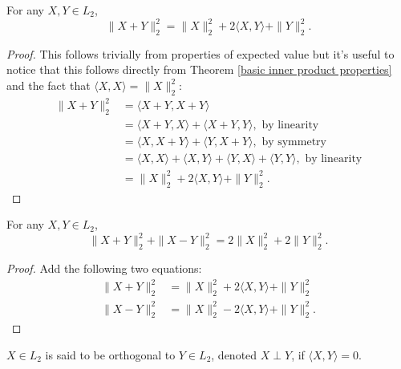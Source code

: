 \begin{theorem}[{\bf Pythagorean}]
For any $X, Y\in L_2$,
\[ \|X+Y \|_2^2 = \|X \|_2^2 +2\langle X, Y\rangle +\| Y \|_2^2.\]
\end{theorem}
\begin{proof}
This follows trivially from properties of expected value but it's useful to notice that this follows directly from Theorem \ref{basic inner product properties} and the fact that $\langle X, X\rangle = \|X\|_2^2$:
\begin{align*}
\|X+Y \|_2^2
&= \langle X+Y, X+Y\rangle \\
&= \langle X+Y, X\rangle + \langle X+Y, Y\rangle,\,\,\text{by linearity}\\
&= \langle X, X+Y\rangle + \langle Y,  X+Y \rangle,\,\,\text{by symmetry}\\
&= \langle X, X\rangle +\langle X, Y\rangle + \langle Y,  X \rangle+\langle Y,  Y \rangle,\,\,\text{by linearity}\\
& =  \|X \|_2^2 +2\langle X, Y\rangle +\| Y \|_2^2.
\end{align*}
\end{proof}



\begin{theorem}[{\bf Parallelogram}]
For any $X, Y\in L_2$,
\[ \|X+Y \|_2^2 + \|X-Y \|_2^2= 2\|X \|_2^2 + 2\| Y \|_2^2.\]
\end{theorem}
\begin{proof}
Add the following two equations:
\begin{align*}
\|X+Y \|_2^2 &= \|X \|_2^2 +2\langle X, Y\rangle +\| Y \|_2^2 \\
\|X-Y \|_2^2 &= \|X \|_2^2 -2\langle X, Y\rangle +\| Y \|_2^2.
\end{align*}
\end{proof}



\begin{definition}[{\bf Orthogonal}]
$X\in L_2$ is said to be orthogonal to $Y\in L_2$, denoted $X\perp Y$, if $\langle X, Y\rangle = 0$.
\end{definition}




